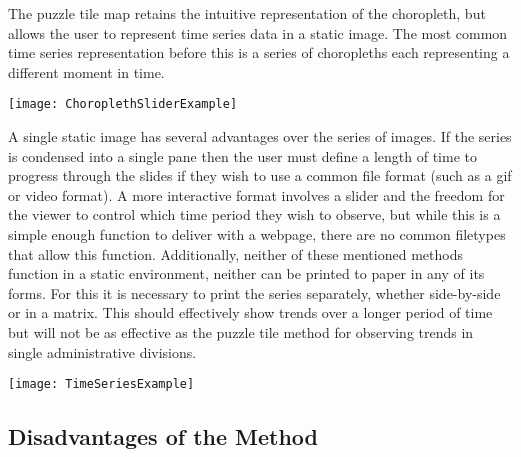 \documentclass[a4paper,man,natbib]{apa6}
\begin{document}
	The puzzle tile map retains the intuitive representation of the choropleth, but allows the user to represent time series data in a static image. The most common time series representation before this is a series of choropleths each representing a different moment in time. \vspace{1em}
	
	\begin{minipage}{\linewidth}
		\begin{center}
			\texttt{[image: ChoroplethSliderExample]}
		\end{center}
	\end{minipage}\vspace{2em}
	
	A single static image has several advantages over the series of images. If the series is condensed into a single pane then the user must define a length of time to progress through the slides if they wish to use a common file format (such as a gif or video format). A more interactive format involves a slider and the freedom for the viewer to control which time period they wish to observe, but while this is a simple enough function to deliver with a webpage, there are no common filetypes that allow this function. Additionally, neither of these mentioned methods function in a static environment, neither can be printed to paper in any of its forms. For this it is necessary to print the series separately, whether side-by-side or in a matrix. This should effectively show trends over a longer period of time but will not be as effective as the puzzle tile method for observing trends in single administrative divisions. \vspace{1em}
	
	\begin{minipage}{\linewidth}
		\begin{center}
			\texttt{[image: TimeSeriesExample]}
		\end{center}
	\end{minipage}\vspace{2em}

	\subsection{Disadvantages of the Method}
	
\end{document}
